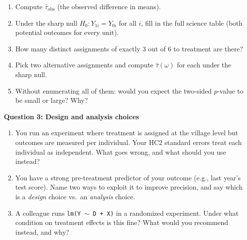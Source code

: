 \documentclass[11pt]{article}
\begin{document}
\begin{enumerate}[label=(\alph*)]
\item Compute $\hat\tau_{\text{obs}}$ (the observed difference in means).

\vspace{1.5cm}

\item Under the sharp null $H_0: Y_{1i} = Y_{0i}$ for all $i$, fill in the full science table (both potential outcomes for every unit).

\vspace{2.5cm}

\item How many distinct assignments of exactly 3 out of 6 to treatment are there?

\vspace{1cm}

\item Pick two alternative assignments and compute $\hat\tau(\omega)$ for each under the sharp null.

\vspace{2.5cm}

\item Without enumerating all of them: would you expect the two-sided $p$-value to be small or large?  Why?

\vspace{2cm}
\end{enumerate}

\bigskip

\noindent\textbf{Question 3: Design and analysis choices}

\begin{enumerate}[label=(\alph*)]
\item You run an experiment where treatment is assigned at the village level but outcomes are measured per individual.  Your HC2 standard errors treat each individual as independent.  What goes wrong, and what should you use instead?

\vspace{2.5cm}

\item You have a strong pre-treatment predictor of your outcome (e.g., last year's test score).  Name two ways to exploit it to improve precision, and say which is a \textit{design} choice vs.\ an \textit{analysis} choice.

\vspace{3cm}

\item A colleague runs \texttt{lm(Y $\sim$ D + X)} in a randomized experiment.  Under what condition on treatment effects is this fine?  What would you recommend instead, and why?

\vspace{3cm}
\end{enumerate}
\end{document}
